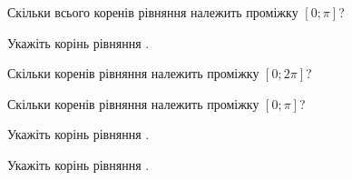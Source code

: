 \documentclass[12pt]{article}
\begin{document}
\begin{samepage}
\noindent\zadnum Скільки всього коренів рівняння  належить проміжку $[0; \pi]$? 

\nmtnobreak
\nopagebreak\nbvspace{0.3cm}
\par{}
\end{samepage}

\begin{samepage}
\noindent\zadnum Укажіть корінь рівняння . 

\nmtnobreak
\nopagebreak\nbvspace{0.3cm}
\par{}
\end{samepage}

\begin{samepage}
\noindent\zadnum Скільки коренів рівняння  належить проміжку $[0; 2\pi]$? 

\nmtnobreak
\nopagebreak\nbvspace{0.3cm}
\par{}
\end{samepage}

\begin{samepage}
\noindent\zadnum Скільки коренів рівняння  належить проміжку $[0; \pi]$? 

\nmtnobreak
\nopagebreak\nbvspace{0.3cm}
\par{}
\end{samepage}

\begin{samepage}
\noindent\zadnum Укажіть корінь рівняння . 

\nmtnobreak
\nopagebreak\nbvspace{0.3cm}
\par{}
\end{samepage}

\begin{samepage}
\noindent\zadnum Укажіть корінь рівняння . 

\nmtnobreak
\nopagebreak\nbvspace{0.3cm}
\par{}
\end{samepage}
\end{document}
